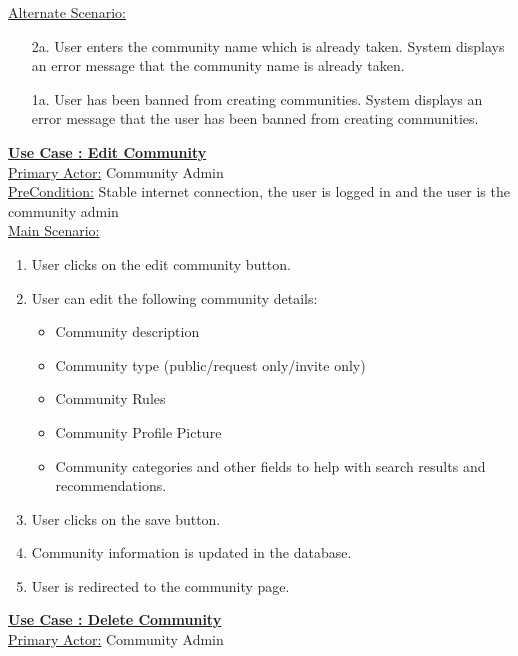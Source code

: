 \documentclass[conference,compsoc]{IEEEtran}
\newcounter{UC}
\newcommand{\nextU}{\stepcounter{UC}\theUC}
\begin{document}
\underline{Alternate Scenario:}\\
\begin{enumerate}
    \item [2a.] User enters the community name which is already taken. System displays an error message that the community name is already taken.
    \item [1a.] User has been banned from creating communities. System displays an error message that the user has been banned from creating communities.
\end{enumerate}\vspace{0.2cm}

\underline{\textbf{Use Case \nextU: Edit Community}}\\

\underline{Primary Actor:} Community Admin\\

\underline{PreCondition:} Stable internet connection, the user is logged in and the user is the community admin\\

\underline{Main Scenario:}\\
\begin{enumerate}
    \item User clicks on the edit community button.
    \item User can edit the following community details:
          \begin{itemize}
              \item Community description
              \item Community type (public/request only/invite only)
              \item Community Rules
              \item Community Profile Picture
              \item Community categories and other fields to help with search results and recommendations.
          \end{itemize}
    \item User clicks on the save button.
    \item Community information is updated in the database.
    \item User is redirected to the community page.
\end{enumerate}

\underline{\textbf{Use Case \nextU: Delete Community}}\\

\underline{Primary Actor:} Community Admin\\
\end{document}
